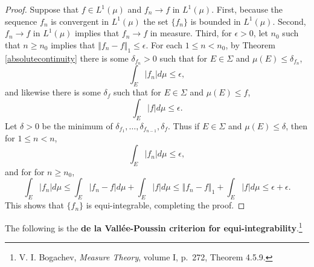 \documentclass{article}
\newcommand{\norm}[1]{\left\Vert #1 \right\Vert}
\theoremstyle{definition}
\begin{document}
\begin{proof}
Suppose that $f \in L^1(\mu)$ and $f_n \to f$ in $L^1(\mu)$. First, because the sequence $f_n$ is convergent in $L^1(\mu)$
the set $\{f_n\}$ is bounded in $L^1(\mu)$. Second, $f_n \to f$ in $L^1(\mu)$ implies
that $f_n \to f$ in measure. Third, 
for $\epsilon>0$,
let $n_0$ such that $n \geq n_0$ implies that $\norm{f_n-f}_1 \leq \epsilon$.
For each $1 \leq n < n_0$,
by Theorem \ref{absolutecontinuity} there is some $\delta_{f_n}>0$ such that
for $E \in \Sigma$ and $\mu(E) \leq \delta_{f_n}$, 
\[
\int_E |f_n| d\mu \leq \epsilon,
\]
and likewise there is some $\delta_f$ such that for $E \in \Sigma$ and $\mu(E) \leq f$,
\[
\int_E |f| d\mu \leq \epsilon.
\]
Let $\delta>0$ be the minimum of $\delta_{f_1},\ldots,\delta_{f_{n-1}},\delta_f$. 
Thus if $E \in \Sigma$ and $\mu(E) \leq \delta$, then for $1 \leq n <n$,
\[
\int_E |f_n| d\mu \leq \epsilon,
\]
and for 
for $n \geq n_0$,
\[
\int_E |f_n| d\mu \leq \int_E |f_n-f| d\mu+\int_E |f| d\mu 
\leq \norm{f_n-f}_1 + \int_E |f| d\mu
\leq \epsilon+\epsilon.
\]
This shows that $\{f_n\}$ is equi-integrable, completing the proof.
\end{proof}



The following is the \textbf{de la Vall\'ee-Poussin criterion for equi-integrability}.\footnote{V. I. Bogachev, {\em Measure Theory}, volume I,
p.~272, Theorem 4.5.9.}
\end{document}
